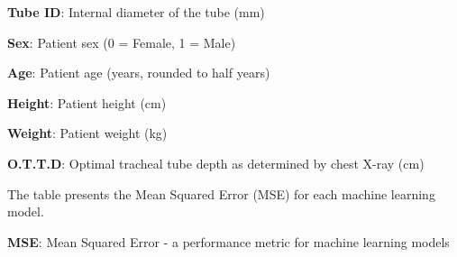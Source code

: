 \documentclass[11pt]{article}
\begin{document}
\begin{table}[h]
\caption{Descriptive statistics of the dataset}
\label{table:desc_stats}
\begin{threeparttable}
\renewcommand{\TPTminimum}{\linewidth}
\begin{tablenotes}
\footnotesize
\item \textbf{Tube ID}: Internal diameter of the tube (mm)
\item \textbf{Sex}: Patient sex (0 = Female, 1 = Male)
\item \textbf{Age}: Patient age (years, rounded to half years)
\item \textbf{Height}: Patient height (cm)
\item \textbf{Weight}: Patient weight (kg)
\item \textbf{O.T.T.D}: Optimal tracheal tube depth as determined by chest X-ray (cm)
\end{tablenotes}
\end{threeparttable}
\end{table}


\begin{table}[h]
\caption{Performance metrics for different machine learning models}
\label{table:machine_learning_performance}
\begin{threeparttable}
\renewcommand{\TPTminimum}{\linewidth}
\begin{tablenotes}
\footnotesize
\item The table presents the Mean Squared Error (MSE) for each machine learning model.
\item \textbf{MSE}: Mean Squared Error - a performance metric for machine learning models
\end{tablenotes}
\end{threeparttable}
\end{table}
\end{document}
